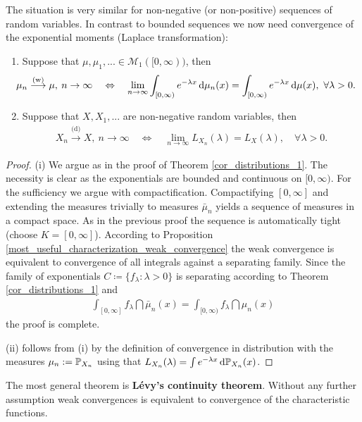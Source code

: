 
The situation is very similar for non-negative (or non-positive) sequences of random variables. In contrast to bounded sequences we now need convergence of the exponential moments (Laplace transformation):
\begin{lAussageWerkzeug}
	\begin{theorem}
		\begin{enumerate}[label=(\roman*)]
			\item Suppose that $\mu,\mu_1,...\in \mathcal M_1([0,\infty))$, then 
		\begin{align*}
		\hspace{-4mm}	\mu_n \overset{\text{(w)}}{\longrightarrow} \mu,\: n \to \infty \quad\Leftrightarrow \quad \lim_{n\to\infty}\int_{[0,\infty)} e^{-\lambda x}\dint \mu_n(x)=\int_{[0,\infty)} e^{-\lambda x}\dint \mu(x),\,\, \forall \lambda >0.
		\end{align*}
		\item Suppose that $X,X_1,...$ are non-negative random variables, then 
		\begin{align*}
			X_n \overset{\text{(d)}}{\longrightarrow} X,\: n \to \infty \quad\Leftrightarrow \quad \lim_{n\to\infty} L_{X_n}(\lambda)=L_X(\lambda), \quad\forall \lambda>0.
		\end{align*}
	\end{enumerate}
	\end{theorem}
	\end{lAussageWerkzeug}
	\begin{proof}[Proof]
		(i) We argue as in the proof of Theorem \ref{cor_distributions_1}. The necessity is clear as the exponentials are bounded and continuous on $[0,\infty)$. For the sufficiency we argue with compactification. Compactifying $[0,\infty]$ and extending the measures trivially to measures $\bar \mu_n$ yields a sequence of measures in a compact space. As in the previous proof the sequence is automatically tight (choose $K=[0,\infty]$). 
		According to Proposition \ref{most_useful_characterization_weak_convergence} the weak convergence is equivalent to convergence of all integrals against a separating family. Since the family of exponentials $C\coloneqq \{ f_{\lambda} \colon \lambda > 0 \}$ is separating according to Theorem \ref{cor_distributions_1} and 
		\begin{align*}
			\int_{[0,\infty]} f_\lambda \dint \bar\mu_n(x)=\int_{[0,\infty)} f_\lambda \dint \mu_n(x)
		\end{align*}		
		the proof is complete.\smallskip

		(ii) follows from (i) by the definition of convergence in distribution with the measures $\mu_n:=\P_{X_n}$ using that $L_{X_n}(\lambda)=\int e^{-\lambda x} \dint \P_{X_n}(x)$.\smallskip
	\end{proof}
The most general theorem is \textbf{L\'evy's continuity theorem}. Without any further assumption weak convergences is equivalent to convergence of the characteristic functions. 


